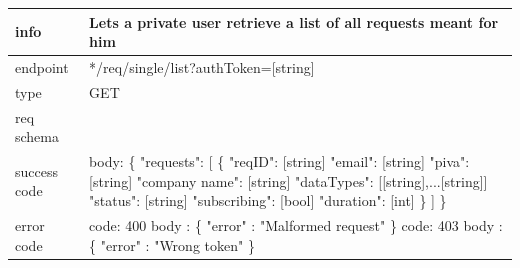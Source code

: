 \documentclass[titlepage]{article}
\begin{document}
\begin{tabularx}{\textwidth}{lX} \hline
    info & Lets a private user retrieve a list of all requests meant for him \\ \hline
    endpoint & */req/single/list?authToken=[string] \\ \hline
    type & GET \\ \hline
    req schema & \\ \hline
    success code & body: \{ \newline
    "requests": [ \newline
    \{ \newline
    "reqID": [string] \newline
    "email": [string] \newline
    "piva": [string] \newline
    "company name": [string] \newline
    "dataTypes": [[string],...[string]] \newline
    "status": [string] \newline
    "subscribing": [bool] \newline
    "duration": [int] \newline
    \} \newline
    ] \newline
    \} \\ \hline
    error code &
        code: 400 \newline
        body : \{ "error" : "Malformed request" \} \newline \newline
        code: 403 \newline
        body : \{ "error" : "Wrong token" \} 
\end{tabularx}
		
\vspace{\baselineskip}
\end{document}
